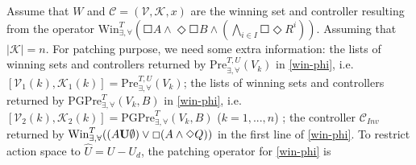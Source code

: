 Assume that $ W $ and $ \mathcal{C}=(\mathcal{V},\mathcal{K},x) $ are the winning set and controller resulting from the operator $
\text{Win}_{\exists, \forall}^{T}\left(\Square A \wedge \Diamond \Square B \wedge \left( \bigwedge_{i\in I} \Square \Diamond R^i\right)\right)$. Assuming that $ \vert \mathcal{K}\vert = n $. For patching purpose, we need some extra information: the lists of winning sets and controllers returned by $\text{Pre}_{\exists,\forall}^{T,U}(V_k)$ in \eqref{win-phi}, i.e. $ [\mathcal{V}_1(k),\mathcal{K}_1(k)]=\text{Pre}_{\exists,\forall}^{T,U}(V_k)$;  the lists of winning sets and controllers returned by $ \text{PGPre}_{\exists,\forall}^{T}(V_k, B) $ in \eqref{win-phi}, i.e. $ [\mathcal{V}_2(k), \mathcal{K}_2(k)]= \text{PGPre}_{\exists,\forall}^{T}(V_k, B)$ ($ k=1,..., n $) ; the controller $ \mathcal{C}_{Inv} $ returned by $ \text{\text{Win}}^{T}_{\exists, \forall} ((A\mathbf{U}\emptyset)\vee \Square (A\wedge \Diamond Q)) $ in the first line of \eqref{win-phi}. To restrict action space to $ \widehat{U} = U-U_d $, the patching operator for \eqref{win-phi} is
